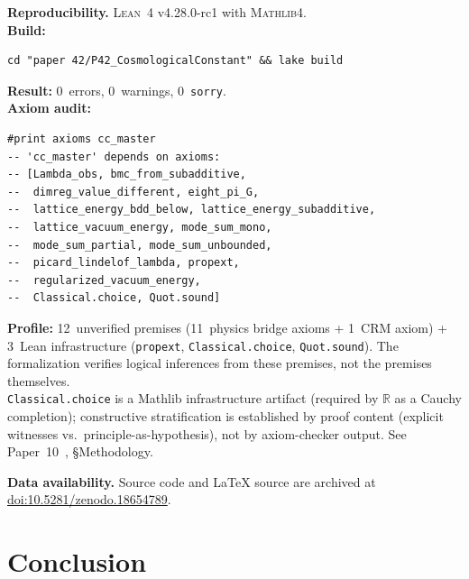 \documentclass[11pt,a4paper]{article}
\theoremstyle{plain}
\theoremstyle{definition}
\newcommand{\RR}{\mathbb{R}}
\newcommand{\Lean}{\textsc{Lean~4}}
\newcommand{\Mathlib}{\textsc{Mathlib4}}
\begin{document}
\begin{mdframed}[linewidth=1pt, linecolor=black!40,
  backgroundcolor=blue!3, roundcorner=5pt]
\textbf{Reproducibility.}
\Lean{} v4.28.0-rc1 with \Mathlib{}.\\[3pt]
\textbf{Build:}
\begin{verbatim}
cd "paper 42/P42_CosmologicalConstant" && lake build
\end{verbatim}
\textbf{Result:} 0~errors, 0~warnings, 0~\texttt{sorry}.\\[3pt]
\textbf{Axiom audit:}
\begin{verbatim}
#print axioms cc_master
-- 'cc_master' depends on axioms:
-- [Lambda_obs, bmc_from_subadditive,
--  dimreg_value_different, eight_pi_G,
--  lattice_energy_bdd_below, lattice_energy_subadditive,
--  lattice_vacuum_energy, mode_sum_mono,
--  mode_sum_partial, mode_sum_unbounded,
--  picard_lindelof_lambda, propext,
--  regularized_vacuum_energy,
--  Classical.choice, Quot.sound]
\end{verbatim}
\textbf{Profile:} 12~unverified premises (11~physics bridge axioms +
1~CRM axiom) + 3~Lean infrastructure (\texttt{propext},
\texttt{Classical.choice}, \texttt{Quot.sound}).
The formalization verifies logical inferences from these premises,
not the premises themselves.\\[3pt]
\texttt{Classical.choice} is a Mathlib infrastructure artifact
(required by $\RR$ as a Cauchy completion);
constructive stratification is established by proof content
(explicit witnesses vs.\ principle-as-hypothesis), not by
axiom-checker output.  See Paper~10~\cite{Lee26P10}, \S Methodology.

\medskip\noindent
\textbf{Data availability.}
Source code and \LaTeX{} source are archived at
\href{https://doi.org/10.5281/zenodo.18654789}{doi:10.5281/zenodo.18654789}.
\end{mdframed}

\section{Conclusion}\label{sec:conclusion}
\end{document}
